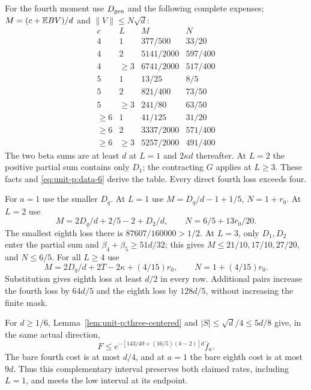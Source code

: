 For the fourth moment use \(D_{\rm gen}\) and the following
complete expenses; \(M=(c+\mathbb E BV)/d\) and
\(\|V\|\le N\sqrt d\):
\begin{equation}\label{eq:unit-p:data-7}
\begin{array}{cc|c|c}
 c&L&M&N\\\hline
 4&1&377/500&33/20\\
 4&2&5141/2000&597/400\\
 4&\ge3&6741/2000&517/400\\
 5&1&13/25&8/5\\
 5&2&821/400&73/50\\
 5&\ge3&241/80&63/50\\
 \ge6&1&41/125&31/20\\
 \ge6&2&3337/2000&571/400\\
 \ge6&\ge3&5257/2000&491/400
\end{array}
\end{equation}
The two beta sums are at least \(d\) at \(L=1\) and
\(2\kappa d\) thereafter. At \(L=2\) the positive partial sum
contains only \(D_1\); the contracting \(G\) applies at \(L\ge3\).
These facts and \eqref{eq:unit-p:data-6} derive the table.
Every direct fourth loss exceeds four.

For \(a=1\) use the smaller \(D_q\).
At \(L=1\) use \(M=D_q/d-1+1/5\), \(N=1+r_0\).
At \(L=2\) use
\[
 M=2D_q/d+2/5-2+D_2/d,\qquad N=6/5+13r_0/20.
\]
The smallest eighth loss there is \(87607/160000>1/2\).
At \(L=3\), only \(D_1,D_2\) enter the partial sum and
\(\beta_4+\beta_5\ge51d/32\); this gives
\(M\le21/10,17/10,27/20\), and \(N\le6/5\).
For all \(L\ge4\) use
\begin{equation}\label{eq:unit-p:data-8}
M=2D_q/d+2T-2\kappa+(4/15)r_0,\qquad
 N=1+(4/15)r_0 .
\end{equation}
Substitution gives eighth loss at least \(d/2\) in every row.
Additional pairs increase the fourth loss by \(64d/5\) and
the eighth loss by \(128d/5\), without increasing the finite mask.

For \(d\ge1/6\), Lemma~\ref{lem:unit-p:three-centered} and
\(|S|\le\sqrt d/4\le5d/8\) give, in the same actual direction,
\[
 F\le
 e^{-[143/40+(16/5)(k-2)]d}\bar f_a .
\]
The bare fourth cost is at most \(d/4\), and at \(a=1\) the
bare eighth cost is at most \(9d\).
Thus this complementary interval preserves both claimed rates,
including \(L=1\), and meets the low interval at its endpoint.

